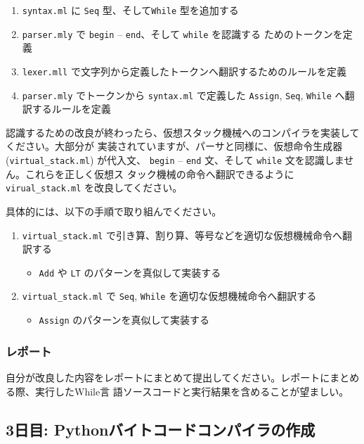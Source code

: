 \documentclass[a4paper,11pt]{jsarticle}
\begin{document}
\noindent{}

\begin{enumerate}
\item \verb|syntax.ml| に \verb|Seq| 型、そして\verb|While| 型を追加する
\item \verb|parser.mly| で \verb|begin| -- \verb|end|、そして \verb|while| を認識する
  ためのトークンを定義
\item \verb|lexer.mll| で文字列から定義したトークンへ翻訳するためのルールを定義
\item \verb|parser.mly| でトークンから \verb|syntax.ml| で定義した \verb|Assign|,
  \verb|Seq|, \verb|While| へ翻訳するルールを定義
\end{enumerate}

\noindent{}

認識するための改良が終わったら、仮想スタック機械へのコンパイラを実装してください。大部分が
実装されていますが、パーサと同様に、仮想命令生成器 (\verb|virtual_stack.ml|) が代入文、
\verb|begin| -- \verb|end| 文、そして \verb|while| 文を認識しません。これらを正しく仮想ス
タック機械の命令へ翻訳できるように \verb|virual_stack.ml| を改良してください。

具体的には、以下の手順で取り組んでください。

\begin{enumerate}
\item \verb|virtual_stack.ml| で引き算、割り算、等号などを適切な仮想機械命令へ翻訳する
  \begin{itemize}
  \item \verb|Add| や \verb|LT| のパターンを真似して実装する
  \end{itemize}
\item \verb|virtual_stack.ml| で \verb|Seq|, \verb|While| を適切な仮想機械命令へ翻訳する
  \begin{itemize}
  \item \verb|Assign| のパターンを真似して実装する
  \end{itemize}
\end{enumerate}

\subsubsection{レポート}

自分が改良した内容をレポートにまとめて提出してください。レポートにまとめる際、実行したWhile言
語ソースコードと実行結果を含めることが望ましい。


\subsection{3日目: Pythonバイトコードコンパイラの作成}
\end{document}
